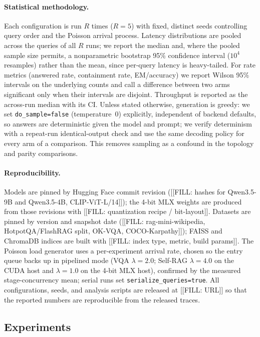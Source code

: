 \paragraph{Statistical methodology.} Each configuration is run $R$ times
($R=5$) with fixed, distinct seeds controlling query order and the
Poisson arrival process. Latency distributions are pooled across the queries of
all $R$ runs; we report the median and, where the pooled sample size permits, a
nonparametric bootstrap 95\% confidence interval ($10^4$ resamples) rather than
the mean, since per-query latency is heavy-tailed. For rate metrics (answered
rate, containment rate, EM/accuracy) we report Wilson 95\% intervals on the
underlying counts and call a difference between two arms significant only when
their intervals are disjoint. Throughput is reported as the across-run median
with its CI. Unless stated otherwise, generation is greedy: we set
\texttt{do\_sample=false} (temperature~0) explicitly, independent of backend
defaults, so answers are deterministic given the model and prompt; we verify
determinism with a repeat-run identical-output check and use the same decoding
policy for every arm of a comparison. This removes sampling as a confound in the
topology and parity comparisons.

\paragraph{Reproducibility.} Models are pinned by Hugging Face commit revision
([[FILL: hashes for Qwen3.5-9B and Qwen3.5-4B, CLIP-ViT-L/14]]); the 4-bit MLX
weights are produced from those revisions with [[FILL: quantization recipe /
bit-layout]]. Datasets are pinned by version and snapshot date
([[FILL: rag-mini-wikipedia, HotpotQA/FlashRAG split, OK-VQA, COCO-Karpathy]]);
FAISS and ChromaDB indices are built with [[FILL: index type, metric, build
params]]. The Poisson load generator uses a per-experiment arrival rate, chosen
so the entry queue backs up in pipelined mode (VQA $\lambda=2.0$; Self-RAG
$\lambda=4.0$ on the CUDA host and $\lambda=1.0$ on the 4-bit MLX host),
confirmed by the measured stage-concurrency mean; serial runs set
\texttt{serialize\_queries=true}. All configurations, seeds, and analysis
scripts are released at [[FILL: URL]] so that the reported numbers are
reproducible from the released traces.

\subsection{Experiments}
\label{sec:experiments}


